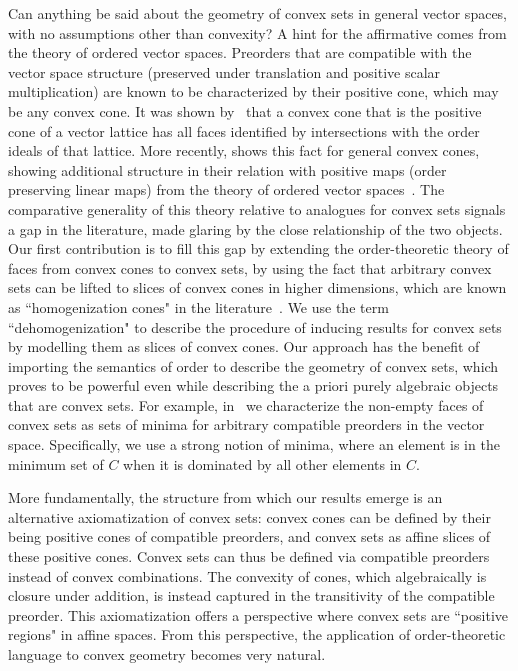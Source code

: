 \documentclass{article}
\theoremstyle{plain}
\theoremstyle{definition}
\theoremstyle{remark}
\begin{document}
Can anything be said about the geometry of convex sets in general vector spaces,
with no assumptions other than convexity?
A hint for the affirmative comes from the theory of ordered vector spaces. 
Preorders that are compatible with the vector space structure 
(preserved under translation and positive scalar multiplication) are known
to be characterized by their positive cone, which may be any convex cone.
It was shown by~\textcite{lewisFacialReductionPartially1994} that
a convex cone that is the positive cone of a vector lattice has all faces identified by
intersections with the order ideals of that lattice.
More recently, \textcite{bruynTensorProductsConvex2020} shows this fact 
for general convex cones, showing additional structure in their relation
with positive maps (order preserving linear maps) from the theory of
ordered vector spaces~\cite{bonsallSublinearFunctionalsIdeals1954}. 
The comparative generality of this theory relative to analogues for
convex sets signals a gap in the literature, made glaring by the close relationship of the two objects.
Our first contribution is to fill this gap by extending the order-theoretic theory of faces from convex cones to convex sets, by using the fact that arbitrary convex sets can be lifted
to slices of convex cones in higher dimensions, which are known as
``homogenization cones" in the literature~\cite{bauschkeHomogenizationConePolar2023}.
We use the term ``dehomogenization" to describe the procedure of inducing results for convex sets by modelling them as slices of convex cones.
Our approach has the benefit of importing the semantics of order
to describe the geometry of convex sets, 
which proves to be powerful even while describing the a priori purely
algebraic objects that are convex sets.
For example, in~
we characterize the non-empty faces of convex sets as sets of
minima for arbitrary compatible preorders in the vector space.
Specifically, we use a strong notion of minima, where an element is in the
minimum set of $C$ when it is dominated by all other elements in $C$.

More fundamentally, the structure from which our results emerge is an alternative axiomatization of convex sets: convex cones can be defined by their being positive cones of compatible preorders, and convex sets as affine slices of these positive cones. Convex sets can thus be defined via compatible preorders instead of convex combinations. The convexity of cones, which algebraically is closure under addition, is instead captured in the transitivity of the compatible preorder. This axiomatization offers a perspective where convex sets are ``positive regions" in affine spaces. From this perspective, the application of order-theoretic language to convex geometry becomes very natural.
\end{document}
